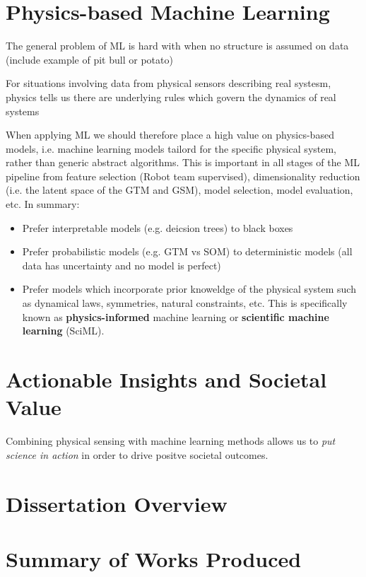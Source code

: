 \section{Physics-based Machine Learning}

The general problem of ML is hard with when no structure is assumed on data (include example of pit bull or potato)

For situations involving data from physical sensors describing real systesm, physics tells us there are underlying rules which govern the dynamics of real systems

When applying ML we should therefore place a high value on physics-based models, i.e. machine learning models tailord for the specific physical system, rather than generic abstract algorithms. This is important in all stages of the ML pipeline from feature selection (Robot team supervised), dimensionality reduction (i.e. the latent space of the GTM and GSM), model selection, model evaluation, etc. In summary:

\begin{itemize}
  \item Prefer interpretable models (e.g. deicsion trees) to black boxes
  \item Prefer probabilistic models (e.g. GTM vs SOM) to deterministic models (all data has uncertainty and no model is perfect)
  \item Prefer models which incorporate prior knoweldge of the physical system such as dynamical laws, symmetries, natural constraints, etc. This is specifically known as \textbf{physics-informed} machine learning or \textbf{scientific machine learning}  (SciML).
\end{itemize}



\section{Actionable Insights and Societal Value}

Combining physical sensing with machine learning methods allows us to \textit{put science in action} in order to drive positve societal outcomes.


\section{Dissertation Overview}

\section{Summary of Works Produced}

